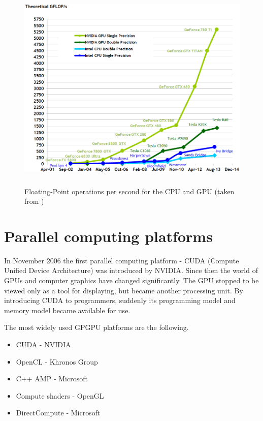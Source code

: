 \begin{center}
\begin{figure}[h]
	\centering\includegraphics[height=10cm]{fig/floating-point-operations-per-second.png}
	\caption{Floating-Point operations per second for the CPU and GPU (taken from \cite{cuda-toolkit-docs})}
\end{figure}
\end{center}

\section{Parallel computing platforms}

In November 2006 the first parallel computing platform - CUDA (Compute Unified Device Architecture) was introduced by NVIDIA. Since then the world of GPUs and computer graphics have changed significantly. The GPU stopped to be viewed only as a tool for displaying, but became another processing unit. By introducing CUDA to programmers, suddenly its programming model and memory model became available for use. 

The most widely used GPGPU platforms are the following.

\begin{itemize}
	\item CUDA - NVIDIA
	\item OpenCL - Khronos Group
	\item C++ AMP - Microsoft	
	\item Compute shaders - OpenGL
	\item DirectCompute - Microsoft
\end{itemize}


